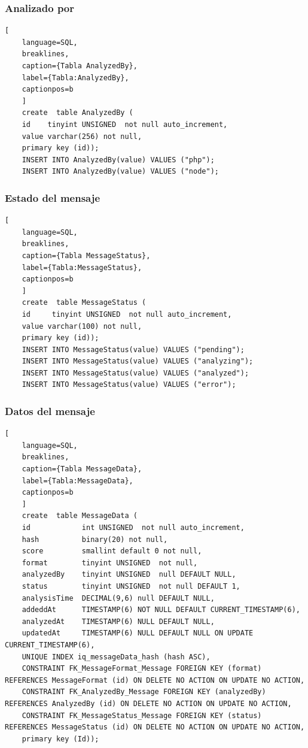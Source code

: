 \subsubsection{Analizado por}
\begin{lstlisting}[
    language=SQL,
    breaklines, 
    caption={Tabla AnalyzedBy}, 
    label={Tabla:AnalyzedBy}, 
    captionpos=b
    ]
    create  table AnalyzedBy (
    id    tinyint UNSIGNED  not null auto_increment, 
    value varchar(256) not null, 
    primary key (id));
    INSERT INTO AnalyzedBy(value) VALUES ("php");
    INSERT INTO AnalyzedBy(value) VALUES ("node");
\end{lstlisting}

\subsubsection{Estado del mensaje}
\begin{lstlisting}[
    language=SQL,
    breaklines, 
    caption={Tabla MessageStatus}, 
    label={Tabla:MessageStatus}, 
    captionpos=b
    ]
    create  table MessageStatus (
    id     tinyint UNSIGNED  not null auto_increment, 
    value varchar(100) not null, 
    primary key (id));
    INSERT INTO MessageStatus(value) VALUES ("pending");
    INSERT INTO MessageStatus(value) VALUES ("analyzing");
    INSERT INTO MessageStatus(value) VALUES ("analyzed");
    INSERT INTO MessageStatus(value) VALUES ("error");
\end{lstlisting}

\subsubsection{Datos del mensaje}
\begin{lstlisting}[
    language=SQL,
    breaklines, 
    caption={Tabla MessageData}, 
    label={Tabla:MessageData}, 
    captionpos=b
    ]
    create  table MessageData (
    id            int UNSIGNED  not null auto_increment, 
    hash          binary(20) not null, 
    score         smallint default 0 not null, 
    format        tinyint UNSIGNED  not null, 
    analyzedBy    tinyint UNSIGNED  null DEFAULT NULL, 
    status        tinyint UNSIGNED  not null DEFAULT 1, 
    analysisTime  DECIMAL(9,6) null DEFAULT NULL,
    addeddAt      TIMESTAMP(6) NOT NULL DEFAULT CURRENT_TIMESTAMP(6),
    analyzedAt    TIMESTAMP(6) NULL DEFAULT NULL,
    updatedAt     TIMESTAMP(6) NULL DEFAULT NULL ON UPDATE CURRENT_TIMESTAMP(6),
    UNIQUE INDEX iq_messageData_hash (hash ASC),
    CONSTRAINT FK_MessageFormat_Message FOREIGN KEY (format) REFERENCES MessageFormat (id) ON DELETE NO ACTION ON UPDATE NO ACTION,
    CONSTRAINT FK_AnalyzedBy_Message FOREIGN KEY (analyzedBy) REFERENCES AnalyzedBy (id) ON DELETE NO ACTION ON UPDATE NO ACTION,
    CONSTRAINT FK_MessageStatus_Message FOREIGN KEY (status) REFERENCES MessageStatus (id) ON DELETE NO ACTION ON UPDATE NO ACTION,
    primary key (Id));
\end{lstlisting}

